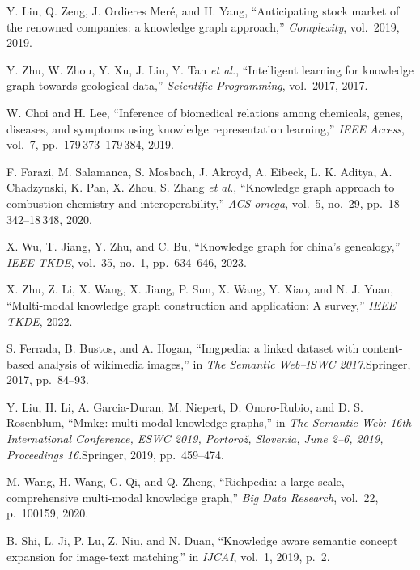 \begin{enumerate}[leftmargin=2em,label={[\arabic*]}]
\item Y. Liu, Q. Zeng, J. Ordieres Mer\'{e}, and H. Yang, ``Anticipating stock market of the renowned companies: a knowledge graph approach,'' \textit{Complexity}, vol.~2019, 2019.

\item Y. Zhu, W. Zhou, Y. Xu, J. Liu, Y. Tan \textit{et al.}, ``Intelligent learning for knowledge graph towards geological data,'' \textit{Scientific Programming}, vol.~2017, 2017.

\item W. Choi and H. Lee, ``Inference of biomedical relations among chemicals, genes, diseases, and symptoms using knowledge representation learning,'' \textit{IEEE Access}, vol.~7, pp.~179\,373--179\,384, 2019.

\item F. Farazi, M. Salamanca, S. Mosbach, J. Akroyd, A. Eibeck, L. K. Aditya, A. Chadzynski, K. Pan, X. Zhou, S. Zhang \textit{et al.}, ``Knowledge graph approach to combustion chemistry and interoperability,'' \textit{ACS omega}, vol.~5, no.~29, pp.~18\,342--18\,348, 2020.

\item X. Wu, T. Jiang, Y. Zhu, and C. Bu, ``Knowledge graph for china's genealogy,'' \textit{IEEE TKDE}, vol.~35, no.~1, pp.~634--646, 2023.

\item X. Zhu, Z. Li, X. Wang, X. Jiang, P. Sun, X. Wang, Y. Xiao, and N. J. Yuan, ``Multi-modal knowledge graph construction and application: A survey,'' \textit{IEEE TKDE}, 2022.

\item S. Ferrada, B. Bustos, and A. Hogan, ``Imgpedia: a linked dataset with content-based analysis of wikimedia images,'' in \textit{The Semantic Web--ISWC 2017}.\quad Springer, 2017, pp.~84--93.

\item Y. Liu, H. Li, A. Garcia-Duran, M. Niepert, D. Onoro-Rubio, and D. S. Rosenblum, ``Mmkg: multi-modal knowledge graphs,'' in \textit{The Semantic Web: 16th International Conference, ESWC 2019, Portoro\v{z}, Slovenia, June 2--6, 2019, Proceedings 16}.\quad Springer, 2019, pp.~459--474.

\item M. Wang, H. Wang, G. Qi, and Q. Zheng, ``Richpedia: a large-scale, comprehensive multi-modal knowledge graph,'' \textit{Big Data Research}, vol.~22, p.~100159, 2020.

\item B. Shi, L. Ji, P. Lu, Z. Niu, and N. Duan, ``Knowledge aware semantic concept expansion for image-text matching.'' in \textit{IJCAI}, vol.~1, 2019, p.~2.


\end{enumerate}
